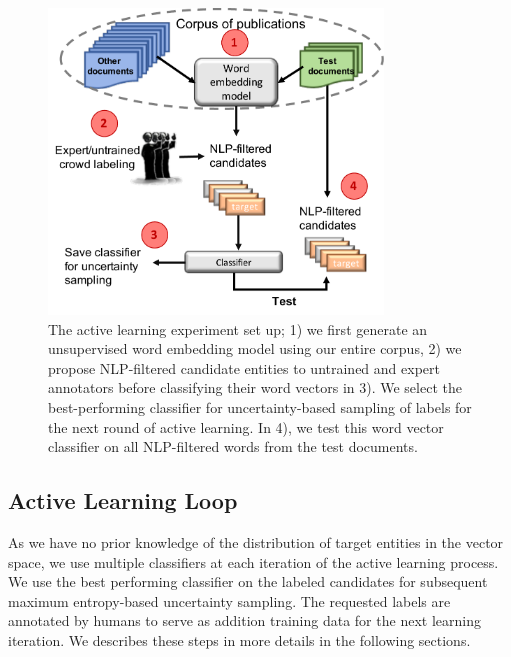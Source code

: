 \begin{figure}
\centering
\includegraphics[trim=0in 0.1in 0.1in 0.in,clip,width=3.5in]{figures/al_setup.pdf}
\caption{\label{fig:current} The active learning experiment set up; 1) we first generate an unsupervised word embedding model using our entire corpus, 2) we propose NLP-filtered candidate entities to untrained and expert annotators before classifying their word vectors in 3). We select the best-performing classifier for uncertainty-based sampling of labels for the next round of active learning. In 4), we test this word vector classifier on all NLP-filtered words from the test documents. 
}
\end{figure}

\subsection{Active Learning Loop}
As we have no prior knowledge of the distribution of target entities in the vector space, 
we use multiple classifiers at each iteration of the active learning process. 
We use the best performing classifier on the labeled candidates for subsequent maximum entropy-based uncertainty sampling. 
The requested labels are annotated by humans to serve as addition training data for the next learning iteration. 
We describes these steps in more details in the following sections.

